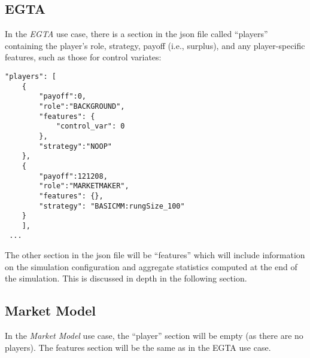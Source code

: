 \documentclass[11pt]{article}
\begin{document}
\subsection{EGTA}

In the \emph{EGTA} use case, there is a section in the json file called ``players'' containing the player's role, strategy, payoff (i.e., surplus), and any player-specific features, such as those for control variates:

\begin{verbatim}
"players": [
    {
        "payoff":0,
        "role":"BACKGROUND",
        "features": {
            "control_var": 0
        },    
        "strategy":"NOOP"  
    },
    {
        "payoff":121208,
        "role":"MARKETMAKER",
        "features": {},
        "strategy": "BASICMM:rungSize_100"
    }
    ],
 ...
\end{verbatim}

The other section in the json file will be ``features'' which will include information on the simulation configuration and aggregate statistics computed at the end of the simulation. This is discussed in depth in the following section.


\subsection{Market Model}

In the \emph{Market Model} use case, the ``player'' section will be empty (as there are no players). The features section will be the same as in the EGTA use case.
\end{document}
